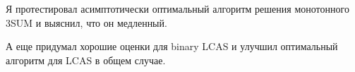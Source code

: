 Я протестировал асимптотически оптимальный алгоритм решения монотонного 3SUM и выяснил, что он медленный.

А еще придумал хорошие оценки для binary LCAS и улучшил оптимальный алгоритм для LCAS в общем случае.